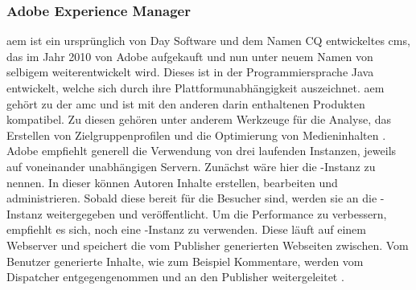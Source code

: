 \subsubsection{Adobe Experience Manager}
\label{sec:aem}
\acf{aem} ist ein ursprünglich von Day Software und dem Namen CQ entwickeltes \ac{cms}, das im Jahr 2010 von Adobe aufgekauft und nun unter neuem Namen von selbigem weiterentwickelt wird. Dieses ist in der Programmiersprache Java entwickelt, welche sich durch ihre Plattformunabhängigkeit auszeichnet. \ac{aem} gehört zu der \ac{amc} und ist mit den anderen darin enthaltenen Produkten kompatibel. Zu diesen gehören unter anderem Werkzeuge für die Analyse, das Erstellen von Zielgruppenprofilen und die Optimierung von Medieninhalten \cite[S. 1-2]{Incorporated2015}. \\
Adobe empfiehlt generell die Verwendung von drei laufenden Instanzen, jeweils auf voneinander unabhängigen Servern. Zunächst wäre hier die -Instanz zu nennen. In dieser können Autoren Inhalte erstellen, bearbeiten und administrieren. Sobald diese bereit für die Besucher sind, werden sie an die -Instanz weitergegeben und veröffentlicht. Um die Performance zu verbessern, empfiehlt es sich, noch eine -Instanz zu verwenden. Diese läuft auf einem Webserver und speichert die vom Publisher generierten Webseiten zwischen. Vom Benutzer generierte Inhalte, wie zum Beispiel Kommentare, werden vom Dispatcher entgegengenommen und an den Publisher weitergeleitet \cite[S. 1-3 f.]{Incorporated2015}.

















